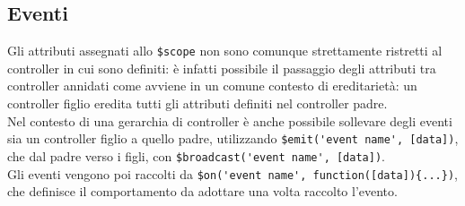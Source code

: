 \subsection{Eventi} 
Gli attributi assegnati allo \lstinline[language=HTML]!$scope! non sono comunque strettamente ristretti al controller in cui sono definiti: è infatti possibile il passaggio degli attributi tra controller annidati come avviene in un comune contesto di ereditarietà: un controller figlio eredita tutti gli attributi definiti nel controller padre.\\ 
Nel contesto di una gerarchia di controller è anche possibile sollevare degli eventi sia un controller figlio a quello padre, utilizzando \lstinline[language=HTML]!$emit('event name', [data])!, che dal padre verso i figli, con \lstinline[language=HTML]!$broadcast('event name', [data])!.\\
Gli eventi vengono poi raccolti da \lstinline[language=HTML]!$on('event name', function([data]){...})!, che definisce il comportamento da adottare una volta raccolto l'evento.\\

